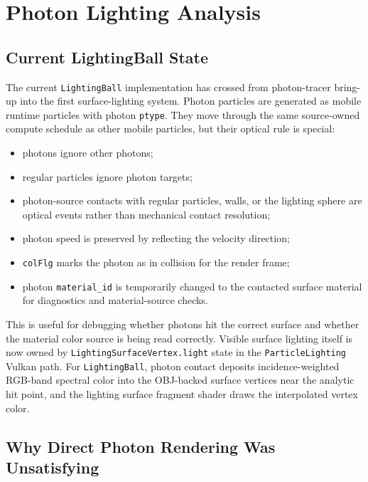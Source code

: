 \newpage
\section{Photon Lighting Analysis}

\subsection{Current LightingBall State}

The current \texttt{LightingBall} implementation has crossed from
photon-tracer bring-up into the first surface-lighting system.  Photon
particles are generated as mobile runtime particles with photon \texttt{ptype}.
They move through the same source-owned compute schedule as other mobile
particles, but their optical rule is special:
\begin{itemize}
    \item photons ignore other photons;
    \item regular particles ignore photon targets;
    \item photon-source contacts with regular particles, walls, or the
          lighting sphere are optical events rather than mechanical contact
          resolution;
    \item photon speed is preserved by reflecting the velocity direction;
    \item \texttt{colFlg} marks the photon as in collision for the render
          frame;
    \item photon \texttt{material\_id} is temporarily changed to the contacted
          surface material for diagnostics and material-source checks.
\end{itemize}

This is useful for debugging whether photons hit the correct surface and
whether the material color source is being read correctly.  Visible surface
lighting itself is now owned by \texttt{LightingSurfaceVertex.light} state in
the \texttt{ParticleLighting} Vulkan path.  For \texttt{LightingBall}, photon
contact deposits incidence-weighted RGB-band spectral color into the
OBJ-backed surface vertices near the analytic hit point, and the lighting
surface fragment shader draws the interpolated vertex color.

\subsection{Why Direct Photon Rendering Was Unsatisfying}

